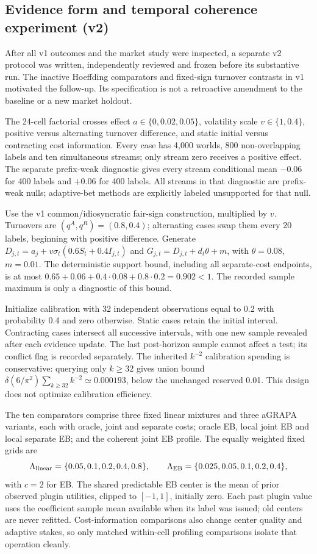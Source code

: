 \subsection{Evidence form and temporal coherence experiment (v2)}
\label{sec:followup-design}

After all v1 outcomes and the market study were inspected, a separate v2
protocol was written, independently reviewed and frozen before its substantive
run. The inactive Hoeffding comparators and fixed-sign turnover contrasts in
v1 motivated the follow-up. Its specification is not a retroactive amendment
to the baseline or a new market holdout.

The 24-cell factorial crosses effect $a\in\{0,0.02,0.05\}$, volatility scale
$v\in\{1,0.4\}$, positive versus alternating turnover difference, and static
initial versus contracting cost information. Every case has 4,000 worlds,
800 non-overlapping labels and ten simultaneous streams; only stream zero
receives a positive effect. The separate prefix-weak diagnostic gives every
stream conditional mean $-0.06$ for 400 labels and $+0.06$ for 400 labels.
All streams in that diagnostic are prefix-weak nulls; adaptive-bet methods are
explicitly labeled unsupported for that null.

Use the v1 common/idiosyncratic fair-sign construction, multiplied by $v$.
Turnovers are $(q^A,q^R)=(0.8,0.4)$; alternating cases swap them every 20
labels, beginning with positive difference. Generate
$D_{j,t}=a_j+v\sigma_t(0.6S_t+0.4I_{j,t})$ and
$G_{j,t}=D_{j,t}+d_t\theta+m$, with $\theta=0.08$, $m=0.01$.
The deterministic support bound, including all separate-cost endpoints, is
at most $0.65+0.06+0.4\cdot0.08+0.8\cdot0.2=0.902<1$.
The recorded sample maximum is only a diagnostic of this bound.

Initialize calibration with 32 independent observations equal to 0.2 with
probability 0.4 and zero otherwise. Static cases retain the initial interval.
Contracting cases intersect all successive intervals, with one new sample
revealed after each evidence update. The last post-horizon sample cannot
affect a test; its conflict flag is recorded separately. The inherited
$k^{-2}$ calibration spending is conservative: querying only $k\geq32$ gives
union bound $\delta(6/\pi^2)\sum_{k\geq32}k^{-2}\simeq0.000193$, below the
unchanged reserved 0.01. This design does not optimize calibration efficiency.

The ten comparators comprise three fixed linear mixtures and three aGRAPA
variants, each with oracle, joint and separate costs; oracle EB, local joint EB
and local separate EB; and the coherent joint EB profile.
The equally weighted fixed grids are
\[
 \Lambda_{\rm linear}=\{0.05,0.1,0.2,0.4,0.8\},\qquad
 \Lambda_{\rm EB}=\{0.025,0.05,0.1,0.2,0.4\},
\]
with $c=2$ for EB.
The shared predictable EB center is the mean of prior observed plugin
utilities, clipped to $[-1,1]$, initially zero. Each past plugin value uses
the coefficient sample mean available when its label was issued; old centers
are never refitted. Cost-information comparisons also change center quality
and adaptive stakes, so only matched within-cell profiling comparisons isolate
that operation cleanly.

